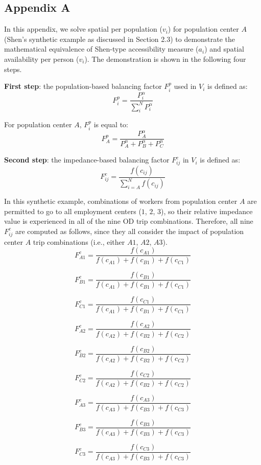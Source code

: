 \documentclass[10pt,letterpaper]{article}
\begin{document}
\begin{landscape}

\section{Appendix A}

In this appendix, we solve spatial per population ($v_i$) for population center $A$ (Shen's synthetic example as discussed in Section 2.3) to demonstrate the mathematical equivalence of Shen-type accessibility measure ($a_i$) and spatial availability per person ($v_i$). The demonstration is shown in the following four steps.

\textbf{First step}: the population-based balancing factor $F^p_{i}$ used in $V_i$ is defined as:
$$
F^p_{i} = \frac{P_{i}^\alpha}{\sum_{i}^N P_{i}^\alpha}
$$

For population center $A$, $F^p_{i}$ is equal to:
$$
F^p_{A} = \frac{P_{A}^\alpha}{P_{A}^\alpha + P_{B}^\alpha + P_{C}^\alpha}
$$

\textbf{Second step}: the impedance-based balancing factor $F^c_{ij}$ in $V_i$ is defined as:
$$
F^c_{ij} = \frac{f(c_{ij})}{\sum_{i=A}^N f(c_{ij})}
$$

In this synthetic example, combinations of workers from population center $A$ are permitted to go to all employment centers ($1$, $2$, $3$), so their relative impedance value is experienced in all of the nine OD trip combinations. Therefore, all nine $F^c_{ij}$ are computed as follows, since they all consider the impact of population center $A$ trip combinations (i.e., either $A1$, $A2$, $A3$).
$$
F^c_{A1} = \frac{f(c_{A1})}{f(c_{A1})+f(c_{B1})+f(c_{C1})}
$$

$$
F^c_{B1} = \frac{f(c_{B1})}{f(c_{A1})+f(c_{B1})+f(c_{C1})}
$$

$$
F^c_{C1} = \frac{f(c_{C1})}{f(c_{A1})+f(c_{B1})+f(c_{C1})}
$$

$$
F^c_{A2} = \frac{f(c_{A2})}{f(c_{A2})+f(c_{B2})+f(c_{C2})}
$$

$$
F^c_{B2} = \frac{f(c_{B2})}{f(c_{A2})+f(c_{B2})+f(c_{C2})}
$$

$$
F^c_{C2} = \frac{f(c_{C2})}{f(c_{A2})+f(c_{B2})+f(c_{C2})}
$$

$$
F^c_{A3} = \frac{f(c_{A3})}{f(c_{A3})+f(c_{B3})+f(c_{C3})}
$$

$$
F^c_{B3} = \frac{f(c_{B3})}{f(c_{A3})+f(c_{B3})+f(c_{C3})}
$$

$$
F^c_{C3} = \frac{f(c_{C3})}{f(c_{A3})+f(c_{B3})+f(c_{C3})}
$$


\end{landscape}
\end{document}

